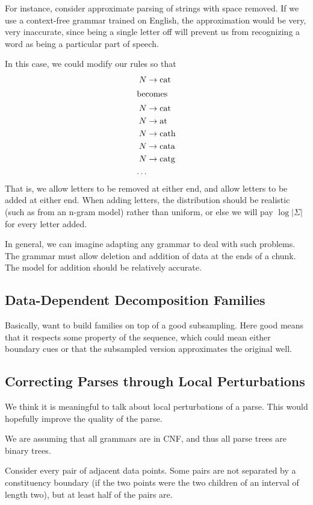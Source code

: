 \documentclass{article}
\begin{document}
For instance, consider approximate parsing of strings with space
removed. If we use a context-free grammar trained on English, the
approximation would be very, very inaccurate, since being a single
letter off will prevent us from recognizing a word as being a
particular part of speech.

In this case, we could modify our rules so that
\begin{align*}
N &\to \mbox{cat} \\
\intertext{becomes}
N &\to \mbox{cat} \\
N &\to \mbox{at} \\
N &\to \mbox{cath} \\
N &\to \mbox{cata} \\
N &\to \mbox{catg} \\
\ldots
\end{align*}
That is, we allow letters to be removed at either end, and allow
letters to be added at either end. When adding letters, the
distribution should be realistic (such as from an n-gram model) rather
than uniform, or else we will pay $\log|\Sigma|$ for every letter
added.

In general, we can imagine adapting any grammar to deal with such
problems. The grammar must allow deletion and addition of data at the
ends of a chunk. The model for addition should be relatively accurate.

\subsection{Data-Dependent Decomposition Families}

Basically, want to build families on top of a good subsampling. Here
good means that it respects some property of the sequence, which could
mean either boundary cues or that the subsampled version approximates
the original well.

\subsection{Correcting Parses through Local Perturbations}

We think it is meaningful to talk about local perturbations of a
parse. This would hopefully improve the quality of the parse.

We are assuming that all grammars are in CNF, and thus all parse trees
are binary trees.

Consider every pair of adjacent data points. Some pairs are not
separated by a constituency boundary (if the two points were the two
children of an interval of length two), but at least half of the pairs
are. 
\end{document}
